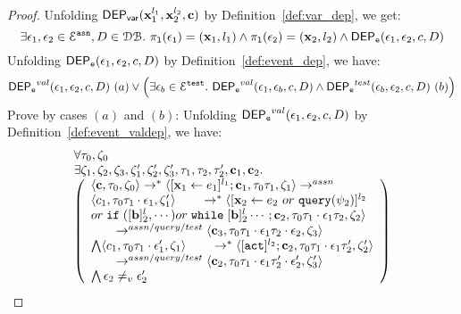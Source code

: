\documentclass[a4paper,11pt]{article}
\begin{document}
\begin{proof}
Unfolding $\mathsf{DEP_{var}}({\boldsymbol{\mathbf{x}}}_1^{l_1}, {\boldsymbol{\mathbf{x}}}_2^{l_2}, {\boldsymbol{\mathbf{c}}})$ by Definition~\ref{def:var_dep},
we get:
\[
\exists \mathtt{\epsilon}_1, \mathtt{\epsilon}_2 \in \mathcal{E}^{\mathtt{{asn}}}, D \in \mathcal{DB}. ~
\mathtt{\pi_{l}(\mathtt{\epsilon}_1)} = ({\boldsymbol{\mathbf{x}}}_1, l_1)
\land
\mathtt{\pi_{l}(\mathtt{\epsilon}_2)} = ({\boldsymbol{\mathbf{x}}}_2, l_2)
\land 
\mathsf{DEP_{\mathtt{e}}}(\mathtt{\epsilon}_1, \mathtt{\epsilon}_2, c, D)
\]
%
Unfolding $\mathsf{DEP_{\mathtt{e}}}(\mathtt{\epsilon}_1, \mathtt{\epsilon}_2, c, D)$ by Definition~\ref{def:event_dep}, we have:
\[
\mathsf{DEP_{\mathtt{e}}}^{val}(\mathtt{\epsilon}_1, \mathtt{\epsilon}_2, c, D) ~ (a) 
\lor
\Big(
\exists \mathtt{\epsilon}_b \in \mathcal{E}^{\mathtt{{test}}}. ~ \mathsf{DEP_{\mathtt{e}}}^{val}(\mathtt{\epsilon}_1, \mathtt{\epsilon}_b, c, D) 
\land \mathsf{DEP_{\mathtt{e}}}^{test}(\mathtt{\epsilon}_b, \mathtt{\epsilon}_2, c, D) ~ (b)
\Big)
\]
Prove by cases $(a)$ and $(b)$:
Unfolding $\mathsf{DEP_{\mathtt{e}}}^{val}(\mathtt{\epsilon}_1, \mathtt{\epsilon}_2, c, D)$ by Definition~\ref{def:event_valdep}, we have:
\[
\begin{array}{ll}
\begin{array}{l}
\forall \vtrace_0, \vcounter_0
\\
\exists \vcounter_1, \vcounter_2, \vcounter_3,
\vcounter_1', \vcounter_2', \vcounter_3', 
\vtrace_1, \vtrace_2, \vtrace_2', \ssa{c}_1, \ssa{c}_2.
\\
  \left(
  \begin{array}{l}   
\config{\ssa{c}, \vtrace_0, \vcounter_0} \rightarrow^{*} 
\config{[\assign{\ssa{x}_1}{\expr_1}]^{l_1} ; \ssa{c}_1, \vtrace_0 \vtrace_1, \vcounter_1}  \rightarrow^{assn}
\\ 
 \config{c_1, \vtrace_0 \vtrace_1 \cdot \event_1, \vcounter_1'} 
  \qquad \rightarrow^{*} 
  \config{[\assign{\ssa{x}_2}{\expr_2 ~ or ~ \query(\qexpr_2)}]^{l_2} 
  \\
  or
  \eif([\sbexpr]^l_2, \cdots) 
  or \ewhile [\sbexpr]^l_2 \cdots; \ssa{c}_2, 
  \vtrace_0 \vtrace_1 \cdot \event_1\vtrace_2, \vcounter_2} 
  \\
  \qquad \rightarrow^{assn/query/test} 
  \config{\ssa{c}_3,  \vtrace_0 \vtrace_1 \cdot \event_1 \vtrace_2 \cdot \event_2, \vcounter_3} 
 \\ 
 \bigwedge
 \config{c_1, \vtrace_0 \vtrace_1 \cdot \event_1', \vcounter_1} 
  \qquad \rightarrow^{*} 
  \config{[\action]^{l_2} ; \ssa{c}_2, \vtrace_0 \vtrace_1 \cdot \event_1 \vtrace_2', \vcounter_2'} 
  \\
  \qquad \rightarrow^{assn/query/test} 
  \config{\ssa{c}_2,  \vtrace_0 \vtrace_1 \cdot \event_1 \vtrace_2' \cdot \event_2', \vcounter_3'} 
\\
\bigwedge
\event_2 \neq_{v} \event_2'
\end{array}
\right)
\end{array} 

\end{array}\]
\end{proof}
\end{document}
